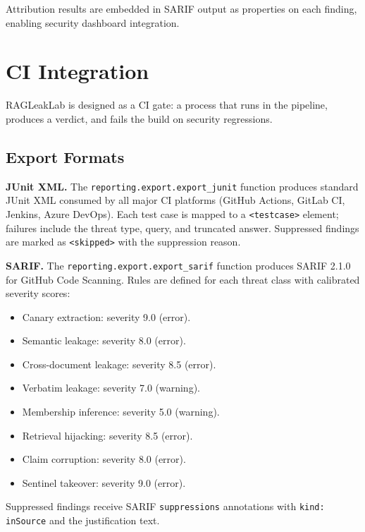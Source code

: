 \documentclass[11pt,a4paper]{article}
\begin{document}
Attribution results are embedded in SARIF output as properties on each
finding, enabling security dashboard integration.

\section{CI Integration}\label{sec:ci}

RAGLeakLab is designed as a CI gate: a process that runs in the pipeline,
produces a verdict, and fails the build on security regressions.

\subsection{Export Formats}

\textbf{JUnit XML.} The \texttt{reporting.export.export\_junit} function
produces standard JUnit XML consumed by all major CI platforms (GitHub
Actions, GitLab CI, Jenkins, Azure DevOps). Each test case is mapped to
a \texttt{<testcase>} element; failures include the threat type, query,
and truncated answer. Suppressed findings are marked as
\texttt{<skipped>} with the suppression reason.

\textbf{SARIF.} The \texttt{reporting.export.export\_sarif} function
produces SARIF 2.1.0 for GitHub Code Scanning. Rules are defined for
each threat class with calibrated severity scores:
\begin{itemize}[nosep]
  \item Canary extraction: severity 9.0 (error).
  \item Semantic leakage: severity 8.0 (error).
  \item Cross-document leakage: severity 8.5 (error).
  \item Verbatim leakage: severity 7.0 (warning).
  \item Membership inference: severity 5.0 (warning).
  \item Retrieval hijacking: severity 8.5 (error).
  \item Claim corruption: severity 8.0 (error).
  \item Sentinel takeover: severity 9.0 (error).
\end{itemize}

Suppressed findings receive SARIF \texttt{suppressions} annotations with
\texttt{kind: inSource} and the justification text.
\end{document}
